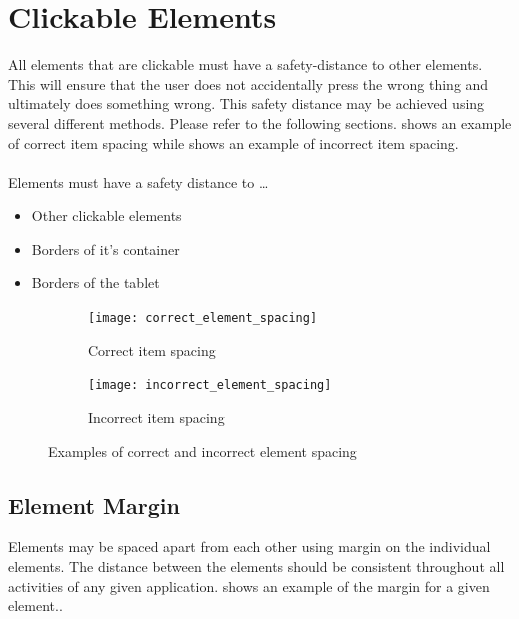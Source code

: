 \section{Clickable Elements}
All elements that are clickable must have a safety-distance to other elements. This will ensure that the user does not accidentally press the wrong thing and ultimately does something wrong. This safety distance may be achieved using several different methods. Please refer to the following sections.  shows an example of correct item spacing while  shows an example of incorrect item spacing.
\\\\
Elements must have a safety distance to \ldots
{}
\begin{itemize}
        \item Other clickable elements
        \item Borders of it's container
        \item Borders of the tablet
\end{itemize}

\begin{figure}[!htbp]
    \centering
    \begin{subfigure}[t]{0.4\textwidth}
        \centering
        \texttt{[image: correct\_element\_spacing]}
        \caption{Correct item spacing}
        \label{fig:correct_element_spacing}
    \end{subfigure}
    \hspace{5em} 
    \begin{subfigure}[t]{0.4\textwidth}
        \centering
        \texttt{[image: incorrect\_element\_spacing]}
        \caption{Incorrect item spacing}
        \label{fig:incorrect_element_spacing}
    \end{subfigure}
    
    \caption{Examples of correct and incorrect element spacing}
    \label{fig:element_spacing_examples}
\end{figure}

\subsection{Element Margin}
Elements may be spaced apart from each other using margin on the individual elements. The distance between the elements should be consistent throughout all activities of any given application.  shows an example of the margin for a given element.. 


